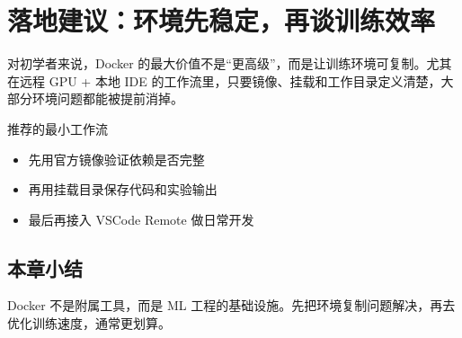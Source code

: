 \section{落地建议：环境先稳定，再谈训练效率}
对初学者来说，Docker 的最大价值不是“更高级”，而是让训练环境可复制。尤其在远程 GPU + 本地 IDE 的工作流里，只要镜像、挂载和工作目录定义清楚，大部分环境问题都能被提前消掉。

\begin{knowledgebox}{推荐的最小工作流}
\begin{itemize}
  \item 先用官方镜像验证依赖是否完整
  \item 再用挂载目录保存代码和实验输出
  \item 最后再接入 VSCode Remote 做日常开发
\end{itemize}
\end{knowledgebox}

\subsection{本章小结}
Docker 不是附属工具，而是 ML 工程的基础设施。先把环境复制问题解决，再去优化训练速度，通常更划算。

\newpage
